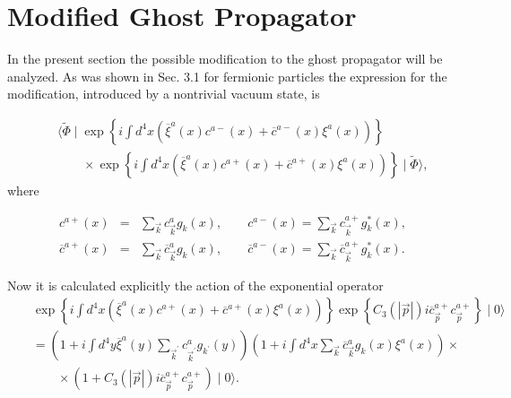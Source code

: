 \documentclass[12pt,letterpaper]{report}
\begin{document}
\section{Modified Ghost Propagator}

In the present section the possible modification to the ghost
propagator will be analyzed. As was shown in Sec. 3.1 for
fermionic particles the expression for the modification,
introduced by a nontrivial vacuum state, is

\begin{eqnarray}
&&\langle \widetilde{\Phi } \mid \exp \left\{ i\int d^4x\left(
\overline{\xi }^a\left(x\right) c^{a-}\left(x\right)
+\overline{c}^{a-}\left(x\right) \xi ^a\left(x\right) \right)
\right\} \nonumber \\&&\qquad \times \exp \left\{ i\int d^4x\left(
\overline{\xi }^a\left(x\right) c^{a+}\left(x\right)
+\overline{c}^{a+}\left(x\right) \xi ^a\left(x\right) \right)
\right\} \mid \widetilde{\Phi }\rangle, \label{ini}
\end{eqnarray}
where

\begin{eqnarray}
c^{a+}\left(x\right)
&=&\sum\limits_{\vec{k}}c_{\vec{k}}^ag_k\left(x\right),\qquad
c^{a-}\left(x\right) =\sum\limits_{\vec{k}}c_{\vec{k}
}^{a+}g_k^{*}\left(x\right), \nonumber \\ \overline{c}^{a+}\left(
x\right) &=&\sum\limits_{\vec{k}}\overline{c}_{\vec{k
}}^ag_k\left(x\right),\qquad \overline{c}^{a-}\left(x\right)
=\sum\limits_{\vec{k}}\overline{c}_{\vec{k}}^{a+}g_k^{*}\left(
x\right).
\end{eqnarray}

Now it is calculated explicitly the action of the exponential
operator
\begin{eqnarray}
&&\exp \left\{ i\int d^4x\left(\overline{\xi }^a\left(x\right)
c^{a+}\left(x\right) +\overline{c}^{a+}\left(x\right) \xi ^a\left(
x\right) \right) \right\} \exp \left\{ C_3\left(\left|
\vec{p}\right| \right) i\overline{c}_{\vec{p}}^{a+}
c_{\vec{p}}^{a+}\right\} \mid 0\rangle \nonumber \\ &&=\left(
1+i\int d^4y\overline{\xi }^a\left(y\right) \sum\limits_{\vec{k}
^{\prime }}c_{\vec{k}^{\prime }}^ag_{k^{\prime }}\left(y\right)
\right) \left(1+i\int d^4x\sum\limits_{\vec{k}}
\overline{c}_{\vec{k}}^ag_k\left(x\right) \xi ^a\left(x\right)
\right) \times \nonumber \\ &&\qquad \times \left(1+C_3\left(
\left| \vec{p}\right| \right) i\overline{c}_{
\vec{p}}^{a+}c_{\vec{p}}^{a+}\right) \mid 0\rangle. \label{Ghost}
\end{eqnarray}
\end{document}
